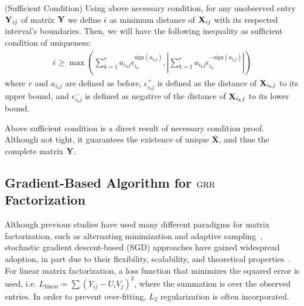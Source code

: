 \documentclass{article}
\begin{document}
\begin{thm:thm} (Sufficient Condition)
Using above necessary condition, for any unobserved entry $\mathbf{Y}_{ij}$ of matrix $\mathbf{Y}$ we define $\bar\epsilon$ as minimum distance of $\mathbf{X}_{ij}$ with its respected interval's boundaries. Then, we will have the following inequality as sufficient condition of uniqueness:
\begin{align}
\bar\epsilon \geq \max \left(\sum_{k=1}^{r}a_{i_kj}\epsilon_{i_k}^{\text{sign}(a_{i_kj})} , \left | \sum_{k=1}^{r}a_{i_kj}\epsilon_{i_k}^{-\text{sign}(a_{i_kj})}  \right |\right)
\end{align}
where $r$ and $a_{i_kj}$ are defined as before, $\epsilon_{i_kj}^{+}$ is defined as the distance of $\mathbf{X}_{i_kj}$ to its upper bound, and $\epsilon_{i_kj}^{-}$ is defined as negative of the distance of $\mathbf{X}_{i_kj}$ to its lower bound.
\end{thm:thm}
Above sufficient condition is a direct result of necessary condition proof. %
Although not tight, it guarantees the existence of unique $\mathbf{\bar X}$, and thus the complete matrix $\mathbf{Y}$.


\subsection{Gradient-Based Algorithm for $\text{GRR}$ Factorization}

Although previous studies have used many different paradigms for matrix factorization, such as alternating minimization \citep{hardt2014understanding,jain2013low} and adaptive sampling~\citep{krishnamurthy2013low}, 
stochastic gradient descent-based (SGD) approaches have gained widespread adoption, in part due to their flexibility, scalability, and theoretical properties~\citep{de2014global}.
For linear matrix factorization, a loss function that minimizes the squared error is used, i.e. $L_{\text{linear}}=\sum (Y_{ij}- U_iV_j)^2$, where the summation is over the observed entries.
In order to prevent over-fitting, $L_2$ regularization is often incorporated.
\end{document}
